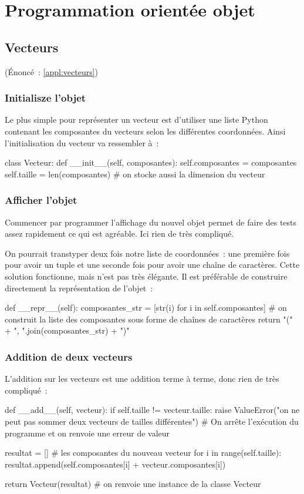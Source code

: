 \section{Programmation orientée objet}

	\subsection{Vecteurs} \label{corr:vecteurs} (Énoncé~: \ref{appl:vecteurs})
		
		\subsubsection{Initialisze l'objet}
		Le plus simple pour représenter un vecteur est d'utiliser une liste Python contenant les composantes du vecteurs selon les différentes coordonnées. Ainsi l'initialisation du vecteur va ressembler à~:
		\begin{pythoncode}
			class Vecteur:
				def __init__(self, composantes):
					self.composantes = composantes
					self.taille = len(composantes) # on stocke aussi la dimension du vecteur
		\end{pythoncode}
		
		\subsubsection{Afficher l'objet}
		Commencer par programmer l'affichage du nouvel objet permet de faire des tests assez rapidement ce qui est agréable. Ici rien de très compliqué.
		
		On pourrait transtyper deux fois notre liste de coordonnées~: une première fois pour avoir un tuple et une seconde fois pour avoir une chaîne de caractères. Cette solution fonctionne, mais n'est pas très élégante. Il est préférable de construire directement la représentation de l'objet~:
		\begin{pythoncode}
			def __repr__(self):
				composantes_str = [str(i) for i in self.composantes] # on construit la liste des composantes sous forme de chaînes de caractères
				return "(" + ", ".join(composantes_str) + ")"
		\end{pythoncode}
		
		\subsubsection{Addition de deux vecteurs}
		L'addition sur les vecteurs est une addition terme à terme, donc rien de très compliqué~:
		\begin{pythoncode}
			def __add__(self, vecteur):
				if self.taille != vecteur.taille:
					raise ValueError("on ne peut pas sommer deux vecteurs de tailles différentes") # On arrête l'exécution du programme et on renvoie une erreur de valeur
				
				resultat = [] # les composantes du nouveau vecteur
				for i in range(self.taille):
					resultat.append(self.composantes[i] + vecteur.composantes[i])
				
				return Vecteur(resultat) # on renvoie une instance de la classe Vecteur
		\end{pythoncode}
		
